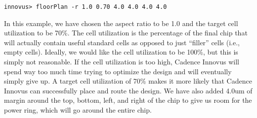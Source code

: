 \documentclass[a4paper,12pt,twoside]{article}
\begin{document}
\begin{verbatim}
innovus> floorPlan -r 1.0 0.70 4.0 4.0 4.0 4.0
\end{verbatim}
In this example, we have chosen the aspect ratio to be 1.0 and the target cell utilization to be 70\%. The cell utilization is the percentage of the final chip that will actually contain useful standard cells as opposed to just “filler” cells (i.e., empty cells). Ideally, we would like the cell utilization to be 100\%, but this is simply not reasonable. If the cell utilization is too high, Cadence Innovus will spend way too much time trying to optimize the design and will eventually simply give up. A target cell utilization of 70\% makes it more likely that Cadence Innovus can successfully place and route the design. We have also added 4.0um of margin around the top, bottom, left, and right of the chip to give us room for the power ring, which will go around the entire chip.
\end{document}
